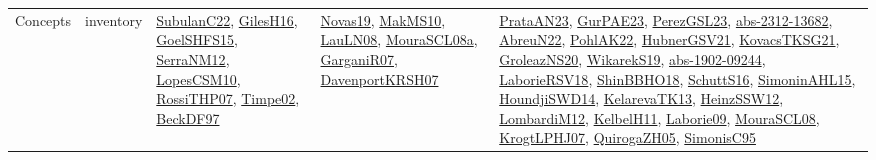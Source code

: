 {\begin{longtable}{lp{3cm}>{\raggedright}p{6cm}>{\raggedright}p{6cm}p{8cm}}
Concepts & inventory & \href{articles/SubulanC22.pdf}{SubulanC22}\cite{SubulanC22}, \href{papers/GilesH16.pdf}{GilesH16}\cite{GilesH16}, \href{articles/GoelSHFS15.pdf}{GoelSHFS15}\cite{GoelSHFS15}, \href{papers/SerraNM12.pdf}{SerraNM12}\cite{SerraNM12}, \href{articles/LopesCSM10.pdf}{LopesCSM10}\cite{LopesCSM10}, \href{papers/RossiTHP07.pdf}{RossiTHP07}\cite{RossiTHP07}, \href{articles/Timpe02.pdf}{Timpe02}\cite{Timpe02}, \href{papers/BeckDF97.pdf}{BeckDF97}\cite{BeckDF97} & \href{articles/Novas19.pdf}{Novas19}\cite{Novas19}, \href{papers/MakMS10.pdf}{MakMS10}\cite{MakMS10}, \href{papers/LauLN08.pdf}{LauLN08}\cite{LauLN08}, \href{papers/MouraSCL08a.pdf}{MouraSCL08a}\cite{MouraSCL08a}, \href{papers/GarganiR07.pdf}{GarganiR07}\cite{GarganiR07}, \href{papers/DavenportKRSH07.pdf}{DavenportKRSH07}\cite{DavenportKRSH07} & \href{articles/PrataAN23.pdf}{PrataAN23}\cite{PrataAN23}, \href{articles/GurPAE23.pdf}{GurPAE23}\cite{GurPAE23}, \href{papers/PerezGSL23.pdf}{PerezGSL23}\cite{PerezGSL23}, \href{articles/abs-2312-13682.pdf}{abs-2312-13682}\cite{abs-2312-13682}, \href{articles/AbreuN22.pdf}{AbreuN22}\cite{AbreuN22}, \href{articles/PohlAK22.pdf}{PohlAK22}\cite{PohlAK22}, \href{articles/HubnerGSV21.pdf}{HubnerGSV21}\cite{HubnerGSV21}, \href{papers/KovacsTKSG21.pdf}{KovacsTKSG21}\cite{KovacsTKSG21}, \href{papers/GroleazNS20.pdf}{GroleazNS20}\cite{GroleazNS20}, \href{articles/WikarekS19.pdf}{WikarekS19}\cite{WikarekS19}, \href{articles/abs-1902-09244.pdf}{abs-1902-09244}\cite{abs-1902-09244}, \href{articles/LaborieRSV18.pdf}{LaborieRSV18}\cite{LaborieRSV18}, \href{articles/ShinBBHO18.pdf}{ShinBBHO18}\cite{ShinBBHO18}, \href{papers/SchuttS16.pdf}{SchuttS16}\cite{SchuttS16}, \href{articles/SimoninAHL15.pdf}{SimoninAHL15}\cite{SimoninAHL15}, \href{papers/HoundjiSWD14.pdf}{HoundjiSWD14}\cite{HoundjiSWD14}, \href{papers/KelarevaTK13.pdf}{KelarevaTK13}\cite{KelarevaTK13}, \href{articles/HeinzSSW12.pdf}{HeinzSSW12}\cite{HeinzSSW12}, \href{articles/LombardiM12.pdf}{LombardiM12}\cite{LombardiM12}, \href{articles/KelbelH11.pdf}{KelbelH11}\cite{KelbelH11}, \href{papers/Laborie09.pdf}{Laborie09}\cite{Laborie09}, \href{papers/MouraSCL08.pdf}{MouraSCL08}\cite{MouraSCL08}, \href{papers/KrogtLPHJ07.pdf}{KrogtLPHJ07}\cite{KrogtLPHJ07}, \href{papers/QuirogaZH05.pdf}{QuirogaZH05}\cite{QuirogaZH05}, \href{papers/SimonisC95.pdf}{SimonisC95}\cite{SimonisC95}\\

\end{longtable}}
